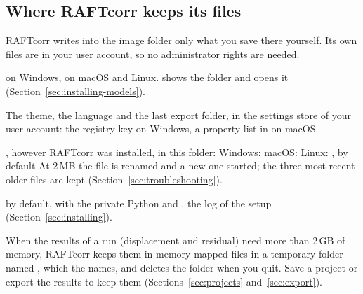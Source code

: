 \subsection{Where RAFTcorr keeps its files}
\label{sec:overview-files}

RAFTcorr writes into the image folder only what you save there yourself. Its own files are in
your user account, so no administrator rights are needed.

\begin{description}[leftmargin=0.6cm,style=nextline]
  \item[Model files]
     on Windows,
     on macOS and Linux.  shows the
    folder and opens it (Section~\ref{sec:installing-models}).
  \item[Settings]
    The theme, the language and the last export folder, in the settings store of your user
    account: the registry key
     on Windows, a property
    list in  on macOS.
  \item[Log file]
    , however RAFTcorr was installed, in this folder:\newline
    Windows: \newline
    macOS: \newline
    Linux: , by default
    \newline
    At 2\,MB the
    file is renamed and a new one started; the three most recent older files are kept
    (Section~\ref{sec:troubleshooting}).
  \item[Windows installation]
     by default, with the
    private Python and , the log of the setup (Section~\ref{sec:installing}).
  \item[Large results]
    When the results of a run (displacement and residual) need more than 2\,GB of memory,
    RAFTcorr keeps them in memory-mapped files in a temporary folder named
    , which the  names, and deletes the folder when you
    quit. Save a project or export the results to keep them (Sections~\ref{sec:projects}
    and~\ref{sec:export}).
\end{description}
